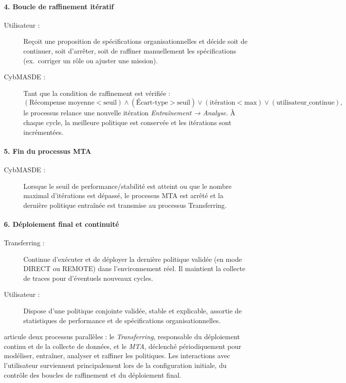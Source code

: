 \paragraph{4. Boucle de raffinement itératif}
\begin{description}
  \item[Utilisateur :] Reçoit une proposition de spécifications organisationnelles et décide soit de continuer, soit d’arrêter, soit de raffiner manuellement les spécifications (ex.~corriger un rôle ou ajuster une mission).
  \item[CybMASDE :] Tant que la condition de raffinement est vérifiée :
    \[
      (\text{Récompense moyenne} < \text{seuil}) \wedge (\text{Écart-type} > \text{seuil}) \vee (\text{itération} < \text{max}) \vee (\text{utilisateur\_continue}),
    \]
    le processus relance une nouvelle itération \textit{Entraînement → Analyse}.
    À chaque cycle, la meilleure politique est conservée et les itérations sont incrémentées.
\end{description}

\paragraph{5. Fin du processus MTA}
\begin{description}
  \item[CybMASDE :] Lorsque le seuil de performance/stabilité est atteint ou que le nombre maximal d’itérations est dépassé, le processus MTA est arrêté et la dernière politique entraînée est transmise au processus Transferring.
\end{description}

\paragraph{6. Déploiement final et continuité}
\begin{description}
  \item[Transferring :] Continue d’exécuter et de déployer la dernière politique validée (en mode DIRECT ou REMOTE) dans l’environnement réel. Il maintient la collecte de traces pour d’éventuels nouveaux cycles.
  \item[Utilisateur :] Dispose d’une politique conjointe validée, stable et explicable, assortie de statistiques de performance et de spécifications organisationnelles.
\end{description}

\medskip
{} articule deux processus parallèles : le \textit{Transferring}, responsable du déploiement continu et de la collecte de données, et le \textit{MTA}, déclenché périodiquement pour modéliser, entraîner, analyser et raffiner les politiques.
Les interactions avec l’utilisateur surviennent principalement lors de la configuration initiale, du contrôle des boucles de raffinement et du déploiement final.

